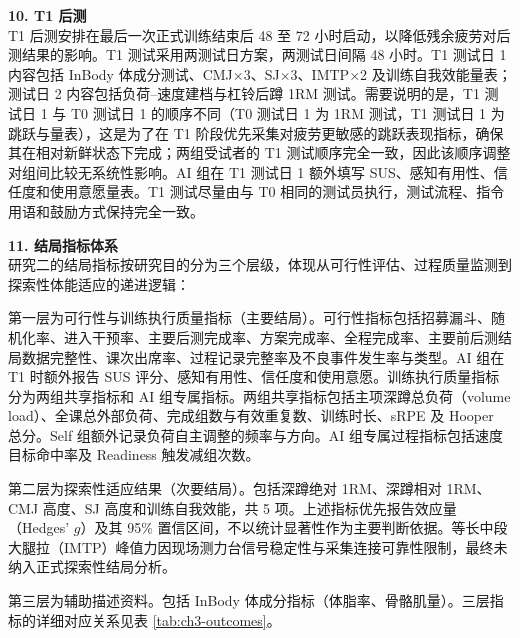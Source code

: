 \documentclass[UTF8,zihao=-4,twoside,openany]{ctexbook}
\begin{document}
\vspace{0.2cm}
\noindent \textbf{10. T1 后测} \\
T1 后测安排在最后一次正式训练结束后 48 至 72 小时启动，以降低残余疲劳对后测结果的影响。T1 测试采用两测试日方案，两测试日间隔 48 小时。T1 测试日 1 内容包括 InBody 体成分测试、CMJ$\times$3、SJ$\times$3、IMTP$\times$2 及训练自我效能量表；测试日 2 内容包括负荷--速度建档与杠铃后蹲 1RM 测试。需要说明的是，T1 测试日 1 与 T0 测试日 1 的顺序不同（T0 测试日 1 为 1RM 测试，T1 测试日 1 为跳跃与量表），这是为了在 T1 阶段优先采集对疲劳更敏感的跳跃表现指标，确保其在相对新鲜状态下完成；两组受试者的 T1 测试顺序完全一致，因此该顺序调整对组间比较无系统性影响。AI 组在 T1 测试日 1 额外填写 SUS、感知有用性、信任度和使用意愿量表。T1 测试尽量由与 T0 相同的测试员执行，测试流程、指令用语和鼓励方式保持完全一致。

\vspace{0.2cm}
\noindent \textbf{11. 结局指标体系} \\
研究二的结局指标按研究目的分为三个层级，体现从可行性评估、过程质量监测到探索性体能适应的递进逻辑：

第一层为可行性与训练执行质量指标（主要结局）。可行性指标包括招募漏斗、随机化率、进入干预率、主要后测完成率、方案完成率、全程完成率、主要前后测结局数据完整性、课次出席率、过程记录完整率及不良事件发生率与类型。AI 组在 T1 时额外报告 SUS 评分、感知有用性、信任度和使用意愿。训练执行质量指标分为两组共享指标和 AI 组专属指标。两组共享指标包括主项深蹲总负荷（volume load）、全课总外部负荷、完成组数与有效重复数、训练时长、sRPE 及 Hooper 总分。Self 组额外记录负荷自主调整的频率与方向。AI 组专属过程指标包括速度目标命中率及 Readiness 触发减组次数。

第二层为探索性适应结果（次要结局）。包括深蹲绝对 1RM、深蹲相对 1RM、CMJ 高度、SJ 高度和训练自我效能，共 5 项。上述指标优先报告效应量（Hedges' $g$）及其 95\% 置信区间，不以统计显著性作为主要判断依据。等长中段大腿拉（IMTP）峰值力因现场测力台信号稳定性与采集连接可靠性限制，最终未纳入正式探索性结局分析。

第三层为辅助描述资料。包括 InBody 体成分指标（体脂率、骨骼肌量）。三层指标的详细对应关系见表 \ref{tab:ch3-outcomes}。
\end{document}
